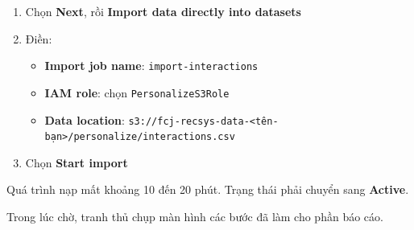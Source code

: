 \begin{Shaded}
\begin{Highlighting}[]
\FunctionTok{\{}
  \FunctionTok{:} \FunctionTok{,}
  \FunctionTok{:} \FunctionTok{,}
  \FunctionTok{:} \FunctionTok{,}
  \FunctionTok{:} \OtherTok{[}
    \FunctionTok{\{} \FunctionTok{:} \FunctionTok{,} \FunctionTok{:}  \FunctionTok{\}}\OtherTok{,}
    \FunctionTok{\{} \FunctionTok{:} \FunctionTok{,} \FunctionTok{:}  \FunctionTok{\}}\OtherTok{,}
    \FunctionTok{\{} \FunctionTok{:} \FunctionTok{,} \FunctionTok{:}  \FunctionTok{\}}\OtherTok{,}
    \FunctionTok{\{} \FunctionTok{:} \FunctionTok{,} \FunctionTok{:}  \FunctionTok{\}}
  \OtherTok{]}\FunctionTok{,}
  \FunctionTok{:} 
\FunctionTok{\}}
\end{Highlighting}
\end{Shaded}

\begin{enumerate}
\def\labelenumi{\arabic{enumi}.}
\setcounter{enumi}{3}
\tightlist
\item
  Chọn \textbf{Next}, rồi \textbf{Import data directly into datasets}
\item
  Điền:

  \begin{itemize}
  \tightlist
  \item
    \textbf{Import job name}: \texttt{import-interactions}
  \item
    \textbf{IAM role}: chọn \texttt{PersonalizeS3Role}
  \item
    \textbf{Data location}:
    \texttt{s3://fcj-recsys-data-\textless{}tên-bạn\textgreater{}/personalize/interactions.csv}
  \end{itemize}
\item
  Chọn \textbf{Start import}
\end{enumerate}

Quá trình nạp mất khoảng 10 đến 20 phút. Trạng thái phải chuyển sang
\textbf{Active}.

Trong lúc chờ, tranh thủ chụp màn hình các bước đã làm cho phần báo cáo.

